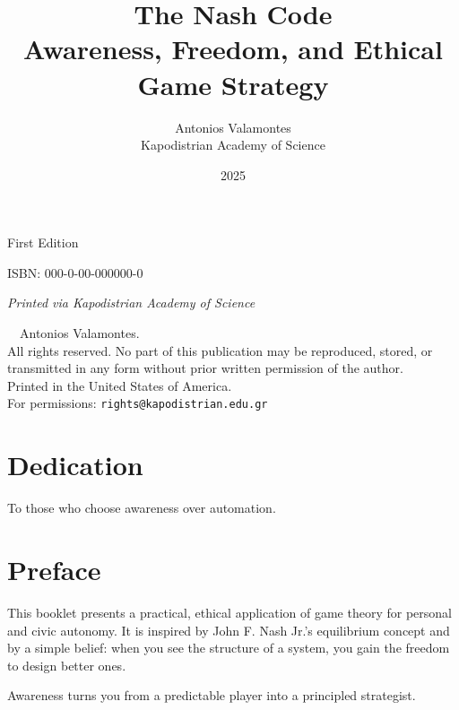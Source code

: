 \documentclass[12pt,twoside]{book}
\title{\Huge\bfseries The Nash Code\\[4pt]
\Large Awareness, Freedom, and Ethical Game Strategy}
\author{\large Antonios Valamontes\\[2pt]
\small Kapodistrian Academy of Science}
\date{\small 2025}
\newcommand{\ISBN}{ISBN: 000-0-00-000000-0}
\newcommand{\Edition}{First Edition}
\newcommand{\PublisherNote}{\small\textit{Printed via Kapodistrian Academy of Science}}
\begin{document}

\frontmatter
\begin{titlepage}
  \centering
  {\vspace*{2cm}\maketitle}
  \vfill
  {\Edition\par}
  {\ISBN\par}
  \vspace{0.5\baselineskip}
  {\PublisherNote\par}
\end{titlepage}

\thispagestyle{empty}
\vspace*{\fill}
\noindent\textcopyright\ \the\year\ Antonios Valamontes.\\
All rights reserved. No part of this publication may be reproduced, stored, or transmitted in any form without prior written permission of the author.\\[6pt]
\noindent Printed in the United States of America.\\
\noindent For permissions: \texttt{rights@kapodistrian.edu.gr}
\vspace*{\fill}
\clearpage

\chapter*{Dedication}
To those who choose awareness over automation.
\clearpage

\tableofcontents
\clearpage

\chapter*{Preface}
This booklet presents a practical, ethical application of game theory for personal and civic autonomy. 
It is inspired by John F. Nash Jr.'s equilibrium concept and by a simple belief: when you see the structure of a system, you gain the freedom to design better ones. \\

\begin{keyidea}
Awareness turns you from a predictable player into a principled strategist.
\end{keyidea}
\clearpage
\end{document}
